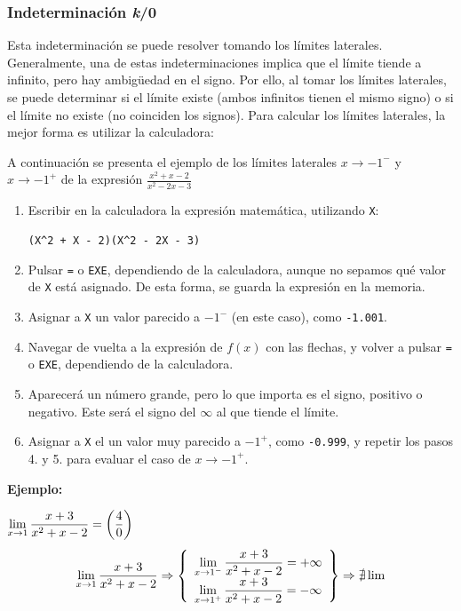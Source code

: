 \documentclass[sans]{apuntes}
\begin{document}
\subsubsection{Indeterminación \emph{k}/0}\label{sec:lims-laterales}
Esta indeterminación se puede resolver tomando los límites laterales. Generalmente, una de estas indeterminaciones implica que el límite tiende a infinito, pero hay ambigüedad en el signo. Por ello, al tomar los límites laterales, se puede determinar si el límite existe (ambos infinitos tienen el mismo signo) o si el límite no existe (no coinciden los signos). Para calcular los límites laterales, la mejor forma es utilizar la calculadora:
\par A continuación se presenta el ejemplo de los límites laterales $x \to -1^-$ y $x \to -1^+$ de la expresión \(\frac{x^2 + x - 2}{x^2 - 2x -3}\)
\begin{enumerate}
	\item Escribir en la calculadora la expresión matemática, utilizando \texttt{X}:
		\par \texttt{(X\textasciicircum 2 + X - 2)\textdiv{}(X\textasciicircum 2 - 2\texttimes{}X - 3)}
	\item Pulsar \texttt{=} o \texttt{EXE}, dependiendo de la calculadora, aunque no sepamos qué valor de \texttt{X} está asignado. De esta forma, se guarda la expresión en la memoria.
	\item Asignar a \texttt{X} un valor parecido a $-1^-$ (en este caso), como \texttt{-1.001}.
	\item Navegar de vuelta a la expresión de $f(x)$ con las flechas, y volver a pulsar \texttt{=} o \texttt{EXE}, dependiendo de la calculadora.
	\item Aparecerá un número grande, pero lo que importa es el signo, positivo o negativo. Este será el signo del $\infty$ al que tiende el límite.
	\item Asignar a \texttt{X} el un valor muy parecido a $-1^+$, como \texttt{-0.999}, y repetir los pasos 4. y 5. para evaluar el caso de $x \to -1^+$.
\end{enumerate}

\begin{examplebox}
	\textbf{Ejemplo:}
	\par \(\displaystyle\lim_{x \to 1}\frac{x + 3}{x^2 + x -2} = \left(\frac40\right)\)
	\[
		\renewcommand{\arraystretch}{1.7}
		\dlim_{x \to 1}\frac{x + 3}{x^2 + x -2}\Rightarrow\left\{\begin{array}{l}
		\dlim_{x \to 1^-}\frac{x + 3}{x^2 + x -2} = +\infty \\
		\dlim_{x \to 1^+}\frac{x + 3}{x^2 + x -2} = -\infty \\
\end{array}\right\} \Rightarrow \nexists \lim\]
\end{examplebox}
\end{document}
